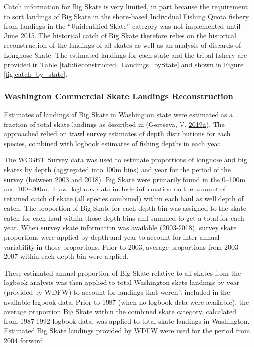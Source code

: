\documentclass[12pt,]{article}
\begin{document}
Catch information for Big Skate is very limited, in part because the
requirement to sort landings of Big Skate in the shore-based Individual
Fishing Quota fishery from landings in the ``Unidentified Skate''
category was not implemented until June 2015. The historical catch of
Big Skate therefore relies on the historical reconstruction of the
landings of all skates as well as an analysis of discards of Longnose
Skate. The estimated landings for each state and the tribal fishery are
provided in Table \ref{tab:Reconstructed_Landings_byState} and shown in
Figure \ref{fig:catch_by_state}.

\hypertarget{washington-commercial-skate-landings-reconstruction}{%
\subsubsection{Washington Commercial Skate Landings
Reconstruction}\label{washington-commercial-skate-landings-reconstruction}}

Estimates of landings of Big Skate in Washington state were estimated as
a fraction of total skate landings as described in (Gertseva, V.
\protect\hyperlink{ref-Gertseva2019}{2019}\protect\hyperlink{ref-Gertseva2019}{a}).
The approached relied on trawl survey estimates of depth distributions
for each species, combined with logbook estimates of fishing depths in
each year.

The WCGBT Survey data was used to estimate proportions of longnose and
big skates by depth (aggregated into 100m bins) and year for the period
of the survey (between 2003 and 2018). Big Skate were primarily found in
the 0--100m and 100--200m. Trawl logbook data include information on the
amount of retained catch of skate (all species combined) within each
haul as well depth of catch. The proportion of Big Skate for each depth
bin was assigned to the skate catch for each haul within those depth
bins and summed to get a total for each year. When survey skate
information was available (2003-2018), survey skate proportions were
applied by depth and year to account for inter-annual variability in
those proportions. Prior to 2003, average proportions from 2003-2007
within each depth bin were applied.

These estimated annual proportion of Big Skate relative to all skates
from the logbook analysis was then applied to total Washington skate
landings by year (provided by WDFW) to account for landings that weren't
included in the available logbook data. Prior to 1987 (when no logbook
data were available), the average proportion Big Skate within the
combined skate category, calculated from 1987-1992 logbook data, was
applied to total skate landings in Washington. Estimated Big Skate
landings provided by WDFW were used for the period from 2004 forward.
\end{document}
